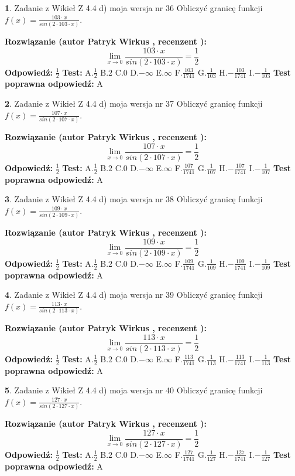 \documentclass[12pt, a4paper]{article}
\theoremstyle{definition} %
\newtheorem{zad}{}
\newcommand{\zadStart}[1]{\begin{zad}#1\newline}
\newcommand{\zadStop}{\end{zad}}
\newcommand{\rozwStart}[2]{\noindent \textbf{Rozwiązanie (autor #1 , recenzent #2): }\newline}
\newcommand{\rozwStop}{\newline}
\newcommand{\odpStart}{\noindent \textbf{Odpowiedź:}\newline}
\newcommand{\odpStop}{\newline}
\newcommand{\testStart}{\noindent \textbf{Test:}\newline}
\newcommand{\testStop}{\newline}
\newcommand{\kluczStart}{\noindent \textbf{Test poprawna odpowiedź:}\newline}
\newcommand{\kluczStop}{\newline}
\begin{document}
\zadStart{Zadanie z Wikieł Z 4.4 d) moja wersja nr 36}
Obliczyć granicę funkcji $f(x)=\frac{103\cdot x}{sin(2 \cdot103\cdot x)}$.
\zadStop
\rozwStart{Patryk Wirkus}{}
$$\lim\limits_{x\to 0}\frac{103\cdot x}{sin(2 \cdot103\cdot x)}=\frac{1}{2}$$
\rozwStop
\odpStart
$\frac{1}{2}$
\odpStop
\testStart
A.$\frac{1}{2}$
B.$2$
C.$0$
D.$-\infty$
E.$\infty$
F.$\frac{103}{1741}$
G.$\frac{1}{103}$
H.$-\frac{103}{1741}$
I.$-\frac{1}{103}$
\testStop
\kluczStart
A
\kluczStop



\zadStart{Zadanie z Wikieł Z 4.4 d) moja wersja nr 37}
Obliczyć granicę funkcji $f(x)=\frac{107\cdot x}{sin(2 \cdot107\cdot x)}$.
\zadStop
\rozwStart{Patryk Wirkus}{}
$$\lim\limits_{x\to 0}\frac{107\cdot x}{sin(2 \cdot107\cdot x)}=\frac{1}{2}$$
\rozwStop
\odpStart
$\frac{1}{2}$
\odpStop
\testStart
A.$\frac{1}{2}$
B.$2$
C.$0$
D.$-\infty$
E.$\infty$
F.$\frac{107}{1741}$
G.$\frac{1}{107}$
H.$-\frac{107}{1741}$
I.$-\frac{1}{107}$
\testStop
\kluczStart
A
\kluczStop



\zadStart{Zadanie z Wikieł Z 4.4 d) moja wersja nr 38}
Obliczyć granicę funkcji $f(x)=\frac{109\cdot x}{sin(2 \cdot109\cdot x)}$.
\zadStop
\rozwStart{Patryk Wirkus}{}
$$\lim\limits_{x\to 0}\frac{109\cdot x}{sin(2 \cdot109\cdot x)}=\frac{1}{2}$$
\rozwStop
\odpStart
$\frac{1}{2}$
\odpStop
\testStart
A.$\frac{1}{2}$
B.$2$
C.$0$
D.$-\infty$
E.$\infty$
F.$\frac{109}{1741}$
G.$\frac{1}{109}$
H.$-\frac{109}{1741}$
I.$-\frac{1}{109}$
\testStop
\kluczStart
A
\kluczStop



\zadStart{Zadanie z Wikieł Z 4.4 d) moja wersja nr 39}
Obliczyć granicę funkcji $f(x)=\frac{113\cdot x}{sin(2 \cdot113\cdot x)}$.
\zadStop
\rozwStart{Patryk Wirkus}{}
$$\lim\limits_{x\to 0}\frac{113\cdot x}{sin(2 \cdot113\cdot x)}=\frac{1}{2}$$
\rozwStop
\odpStart
$\frac{1}{2}$
\odpStop
\testStart
A.$\frac{1}{2}$
B.$2$
C.$0$
D.$-\infty$
E.$\infty$
F.$\frac{113}{1741}$
G.$\frac{1}{113}$
H.$-\frac{113}{1741}$
I.$-\frac{1}{113}$
\testStop
\kluczStart
A
\kluczStop



\zadStart{Zadanie z Wikieł Z 4.4 d) moja wersja nr 40}
Obliczyć granicę funkcji $f(x)=\frac{127\cdot x}{sin(2 \cdot127\cdot x)}$.
\zadStop
\rozwStart{Patryk Wirkus}{}
$$\lim\limits_{x\to 0}\frac{127\cdot x}{sin(2 \cdot127\cdot x)}=\frac{1}{2}$$
\rozwStop
\odpStart
$\frac{1}{2}$
\odpStop
\testStart
A.$\frac{1}{2}$
B.$2$
C.$0$
D.$-\infty$
E.$\infty$
F.$\frac{127}{1741}$
G.$\frac{1}{127}$
H.$-\frac{127}{1741}$
I.$-\frac{1}{127}$
\testStop
\kluczStart
A
\kluczStop
\end{document}
